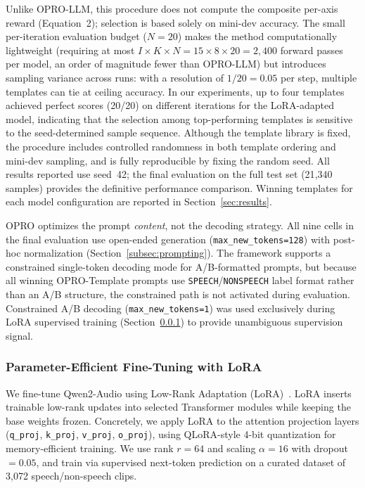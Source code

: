 \documentclass[11pt,a4paper]{article}
\begin{document}
Unlike OPRO-LLM, this procedure does not compute the composite per-axis reward (Equation~2); selection is based solely on mini-dev accuracy. The small per-iteration evaluation budget ($N = 20$) makes the method computationally lightweight (requiring at most $I \times K \times N = 15 \times 8 \times 20 = 2{,}400$ forward passes per model, an order of magnitude fewer than OPRO-LLM) but introduces sampling variance across runs: with a resolution of $1/20 = 0.05$ per step, multiple templates can tie at ceiling accuracy. In our experiments, up to four templates achieved perfect scores (20/20) on different iterations for the LoRA-adapted model, indicating that the selection among top-performing templates is sensitive to the seed-determined sample sequence. Although the template library is fixed, the procedure includes controlled randomness in both template ordering and mini-dev sampling, and is fully reproducible by fixing the random seed. All results reported use seed~42; the final evaluation on the full test set (21{,}340 samples) provides the definitive performance comparison. Winning templates for each model configuration are reported in Section~\ref{sec:results}.

OPRO optimizes the prompt \textit{content}, not the decoding strategy. All nine cells in the final evaluation use open-ended generation (\texttt{max\_new\_tokens=128}) with post-hoc normalization (Section~\ref{subsec:prompting}). The framework supports a constrained single-token decoding mode for A/B-formatted prompts, but because all winning OPRO-Template prompts use \texttt{SPEECH}/\texttt{NONSPEECH} label format rather than an A/B structure, the constrained path is not activated during evaluation. Constrained A/B decoding (\texttt{max\_new\_tokens=1}) was used exclusively during LoRA supervised training (Section~\ref{subsubsec:lora_method}) to provide unambiguous supervision signal.

\subsubsection{Parameter-Efficient Fine-Tuning with LoRA}
\label{subsubsec:lora_method}

We fine-tune Qwen2-Audio using Low-Rank Adaptation (LoRA)~\cite{hu2022lora}. LoRA inserts trainable low-rank updates into selected Transformer modules while keeping the base weights frozen. Concretely, we apply LoRA to the attention projection layers (\texttt{q\_proj}, \texttt{k\_proj}, \texttt{v\_proj}, \texttt{o\_proj}), using QLoRA-style 4-bit quantization for memory-efficient training. We use rank $r = 64$ and scaling $\alpha = 16$ with dropout $= 0.05$, and train via supervised next-token prediction on a curated dataset of 3{,}072 speech/non-speech clips.
\end{document}
